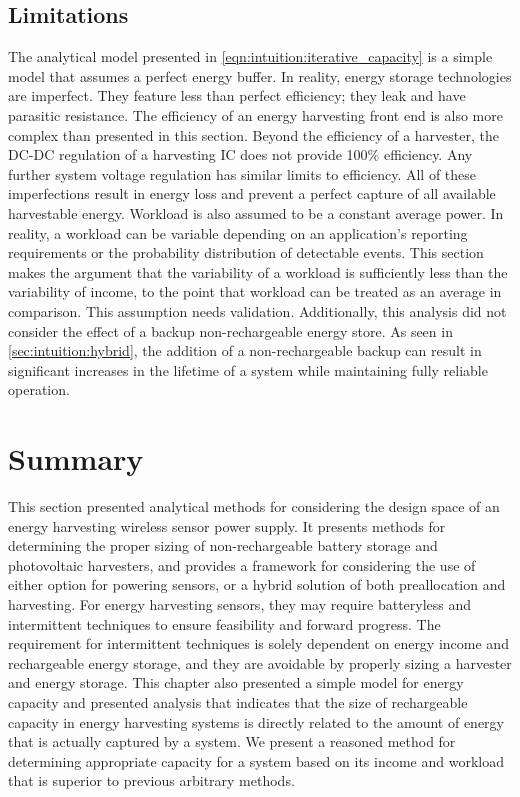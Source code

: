 \subsection{Limitations}
The analytical model presented in \cref{eqn:intuition:iterative_capacity} is a simple model that assumes a perfect energy buffer. In reality, energy storage technologies are imperfect. They feature less than perfect efficiency; they leak and have parasitic resistance. 
The efficiency of an energy harvesting front end is also more complex than presented in this section.
Beyond the efficiency of a harvester, the DC-DC regulation of a harvesting IC does not provide 100\% efficiency. 
Any further system voltage regulation has similar limits to efficiency. 
All of these imperfections result in energy loss and prevent a perfect capture of all available harvestable energy.
Workload is also assumed to be a constant average power. In reality, a workload can be variable depending on an application's reporting requirements or the probability distribution of detectable events.
This section makes the argument that the variability of a workload is sufficiently less than the variability of income, to the point that workload can be treated as an average in comparison. This assumption needs validation.
Additionally, this analysis did not consider the effect of a backup non-rechargeable energy store. As seen in \cref{sec:intuition:hybrid}, the addition of a non-rechargeable backup can result in significant increases in the lifetime of a system while maintaining fully reliable operation.


\section{Summary}
This section presented analytical methods for considering the design space of an energy harvesting wireless sensor power supply.
It presents methods for determining the proper sizing of non-rechargeable battery storage and photovoltaic harvesters, and provides a framework for considering the use of either option for powering sensors, or a hybrid solution of both preallocation and harvesting.
For energy harvesting sensors, they may require batteryless and intermittent techniques to ensure feasibility and forward progress. 
The requirement for intermittent techniques is solely dependent on energy income and rechargeable energy storage, and they are avoidable by properly sizing a harvester and energy storage.
This chapter also presented a simple model for energy capacity and presented analysis that indicates that the size of rechargeable capacity in energy harvesting systems is directly related to the amount of energy that is actually captured by a system.
We present a reasoned method for determining appropriate capacity for a system based on its income and workload that is superior to previous arbitrary methods.

